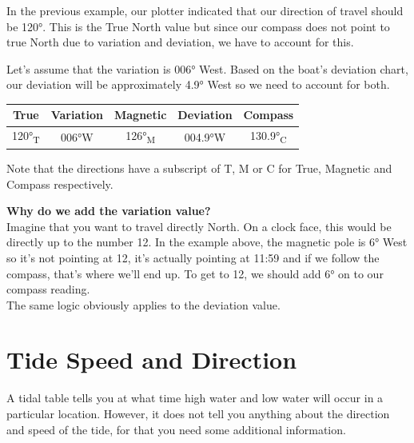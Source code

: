 \documentclass[a4paper,10pt,oneside]{book}
\begin{document}
In the previous example, our plotter indicated that our direction of travel should be 120°. This is the True North value but since our compass does not point to true North due to variation and deviation, we have to account for this.

Let’s assume that the variation is 006° West. Based on the boat’s deviation chart, our deviation will be approximately 4.9° West so we need to account for both.


\begin{center}
	\begin{tabular}{|c|c|c|c|c|}
	\hline
	\textbf{True} & \textbf{Variation} & \textbf{Magnetic} & \textbf{Deviation} & \textbf{Compass} \\
	\hline
	120°\textsubscript{T} & 006°W & 126°\textsubscript{M} & 004.9°W & 130.9°\textsubscript{C} \\
	\hline
	\end{tabular}
\end{center}


Note that the directions have a subscript of T, M or C for True, Magnetic and Compass respectively.


\vspace{50pt}

\begin{center}
	\begin{tcolorbox}[
	colback=gray!10,      %
	colframe=black,       %
	boxrule=0.5pt,        %
	arc=0pt,               %
	left=4pt, right=4pt, top=6pt, bottom=6pt,
	width=0.8\linewidth,
	]
	\textbf{Why do we add the variation value?}\\
	Imagine that you want to travel directly North. On a clock face, this would be directly up to the number 12. In the example above, the magnetic pole is 6° West so it's not pointing at 12, it's actually pointing at 11:59 and if we follow the compass, that's where we'll end up. To get to 12, we should add 6° on to our compass reading.\\
	
	The same logic obviously applies to the deviation value.
	\end{tcolorbox}
\end{center}


\newpage
\section{Tide Speed and Direction}
A tidal table tells you at what time high water and low water will occur in a particular location. However, it does not tell you anything about the direction and speed of the tide, for that you need some additional information.
\end{document}
